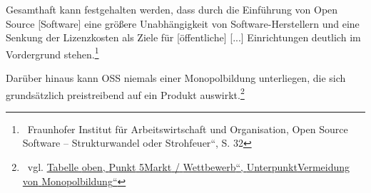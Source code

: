 \documentclass[a4paper]{article}
\newcommand\textstyleInternetlink[1]{\foreignlanguage{english}{\textcolor[rgb]{0.0,0.0,0.5019608}{#1}}}
\begin{document}
\bigskip

{
{\guillemotright}Gesamthaft kann festgehalten werden, dass durch die
Einf\"uhrung von Open Source [Software] eine gr\"o{\ss}ere
Unabh\"angigkeit von Software-Herstellern und eine Senkung der
Lizenzkosten als Ziele f\"ur [\"offentliche] [...] Einrichtungen
deutlich im Vordergrund stehen.{\guillemotleft}\footnote{\ Fraunhofer
Institut f\"ur Arbeitswirtschaft und Organisation, {\quotedblbase}Open
Source Software -- Strukturwandel oder Strohfeuer{\textquotedblleft},
S. 32}}

{
Dar\"uber hinaus kann OSS niemals einer Monopolbildung unterliegen, die
sich grunds\"atzlich preistreibend auf ein Produkt
auswirkt.\footnote{\ vgl.
\hyperlink{VermeidungvonMonopolbildung}{\textstyleInternetlink{Tabelle}}\hyperlink{VermeidungvonMonopolbildung}{\textstyleInternetlink{
}}\hyperlink{VermeidungvonMonopolbildung}{\textstyleInternetlink{oben,}}\hyperlink{VermeidungvonMonopolbildung}{\textstyleInternetlink{
}}\hyperlink{VermeidungvonMonopolbildung}{\textstyleInternetlink{Punkt}}\hyperlink{VermeidungvonMonopolbildung}{\textstyleInternetlink{
}}\hyperlink{VermeidungvonMonopolbildung}{\textstyleInternetlink{5}}\hyperlink{VermeidungvonMonopolbildung}{\textstyleInternetlink{
{\quotedblbase}}}\hyperlink{VermeidungvonMonopolbildung}{\textstyleInternetlink{Markt}}\hyperlink{VermeidungvonMonopolbildung}{\textstyleInternetlink{
}}\hyperlink{VermeidungvonMonopolbildung}{\textstyleInternetlink{/}}\hyperlink{VermeidungvonMonopolbildung}{\textstyleInternetlink{
}}\hyperlink{VermeidungvonMonopolbildung}{\textstyleInternetlink{Wettbewerb}}\hyperlink{VermeidungvonMonopolbildung}{\textstyleInternetlink{{\textquotedblleft}}}\hyperlink{VermeidungvonMonopolbildung}{\textstyleInternetlink{,}}\hyperlink{VermeidungvonMonopolbildung}{\textstyleInternetlink{
}}\hyperlink{VermeidungvonMonopolbildung}{\textstyleInternetlink{Unterpunkt}}\hyperlink{VermeidungvonMonopolbildung}{\textstyleInternetlink{
{\quotedblbase}}}\hyperlink{VermeidungvonMonopolbildung}{\textstyleInternetlink{Vermeidung}}\hyperlink{VermeidungvonMonopolbildung}{\textstyleInternetlink{
}}\hyperlink{VermeidungvonMonopolbildung}{\textstyleInternetlink{von}}\hyperlink{VermeidungvonMonopolbildung}{\textstyleInternetlink{
}}\hyperlink{VermeidungvonMonopolbildung}{\textstyleInternetlink{Monopolbildung}}\hyperlink{VermeidungvonMonopolbildung}{\textstyleInternetlink{{\textquotedblleft}}}}}
\end{document}
